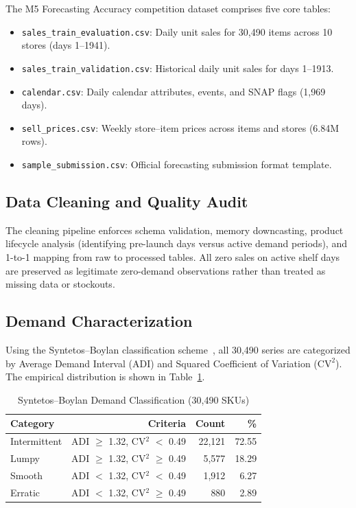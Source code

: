 \documentclass[conference]{IEEEtran}
\begin{document}
The M5 Forecasting Accuracy competition dataset comprises five core tables:
\begin{itemize}
    \item \texttt{sales\_train\_evaluation.csv}: Daily unit sales for 30,490 items across 10 stores (days 1--1941).
    \item \texttt{sales\_train\_validation.csv}: Historical daily unit sales for days 1--1913.
    \item \texttt{calendar.csv}: Daily calendar attributes, events, and SNAP flags (1,969 days).
    \item \texttt{sell\_prices.csv}: Weekly store--item prices across items and stores (6.84M rows).
    \item \texttt{sample\_submission.csv}: Official forecasting submission format template.
\end{itemize}

\subsection{Data Cleaning and Quality Audit}

The cleaning pipeline enforces schema validation, memory downcasting, product lifecycle analysis (identifying pre-launch days versus active demand periods), and 1-to-1 mapping from raw to processed tables. All zero sales on active shelf days are preserved as legitimate zero-demand observations rather than treated as missing data or stockouts.

\subsection{Demand Characterization}

Using the Syntetos--Boylan classification scheme~\cite{syntetos2005accuracy}, all 30,490 series are categorized by Average Demand Interval (ADI) and Squared Coefficient of Variation ($\text{CV}^2$). The empirical distribution is shown in Table~\ref{tab:demand_categories}.

\begin{table}[htbp]
\centering
\caption{Syntetos--Boylan Demand Classification (30,490 SKUs)}
\label{tab:demand_categories}
\begin{tabular}{lrrr}
\toprule
\textbf{Category} & \textbf{Criteria} & \textbf{Count} & \textbf{\%} \\
\midrule
Intermittent & ADI $\geq$ 1.32, CV$^2$ $<$ 0.49 & 22,121 & 72.55 \\
Lumpy        & ADI $\geq$ 1.32, CV$^2$ $\geq$ 0.49 & 5,577  & 18.29 \\
Smooth       & ADI $<$ 1.32, CV$^2$ $<$ 0.49 & 1,912  & 6.27  \\
Erratic      & ADI $<$ 1.32, CV$^2$ $\geq$ 0.49 & 880    & 2.89  \\
\bottomrule
\end{tabular}
\end{table}
\end{document}
